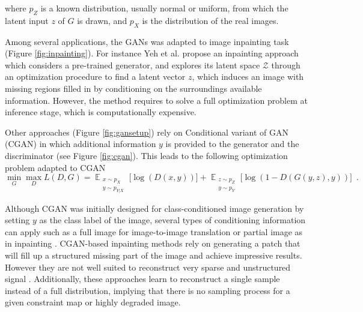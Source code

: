 \noindent where $p_Z$ is a known distribution, usually normal or uniform, from which the latent input $z$ of $G$ is drawn, and $p_X$ is the distribution of the real images. %
%

Among several applications, the GANs was adapted  to image inpainting task (Figure \ref{fig:inpainting}). For instance Yeh et al. \cite{Yeh2017} propose an inpainting approach which considers a pre-trained generator, and explores its latent space $\mathcal{Z}$ through an optimization procedure to find a latent vector $z$, which induces an image with missing regions filled in by conditioning on the surroundings available information. However, the method requires to solve a full optimization problem at inference stage, which is computationally expensive.

Other approaches (Figure \ref{fig:gansetup}) rely on Conditional variant of GAN (CGAN) \cite{mirza2014} in which additional information $y$ is provided to the generator and the discriminator (see Figure \ref{fig:cgan}). 
This leads to the following optimization problem adapted to CGAN
\begin{equation}
\min_G \max_D L(D, G) = \mathop{\mathbb{E}}_{\substack{x\sim p_X \\y \sim p_{Y|X} }} \Big[\log(D(x, y))\Big]
+ \mathop{\mathbb{E}}_{\substack{z\sim p_Z\\y\sim p_Y}} \Big[ \log(1-D(G(y,z),y))\Big] \enspace.
\end{equation}

Although CGAN was initially designed for class-conditioned image generation by setting $y$ as the class label of the image, several types of conditioning information can apply such as a full image for image-to-image translation \cite{Isola2017} or partial image as in inpainting \cite{Yu2018}. CGAN-based inpainting methods rely on generating a patch that will fill up a structured missing part of the image and achieve impressive results. However they are not well suited to reconstruct very sparse and unstructured signal \cite{demir2018}. Additionally, these approaches learn to reconstruct a single sample instead of a full distribution, implying that there is no sampling process for a given constraint map or highly degraded image.

